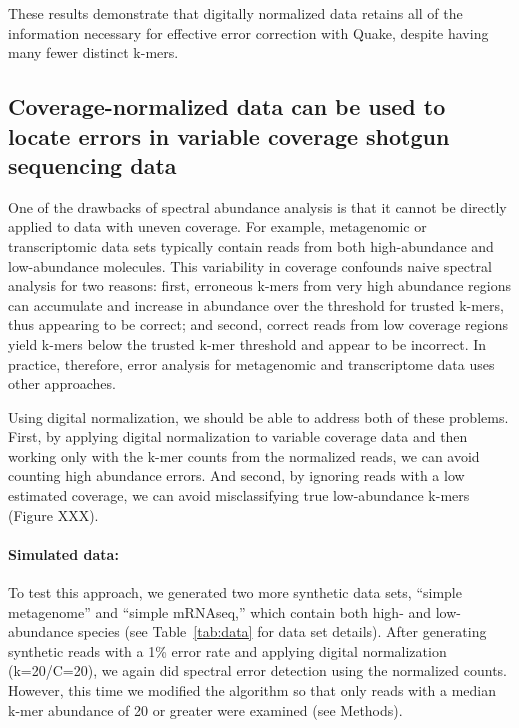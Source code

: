 \documentclass{article}
\begin{document}
These results demonstrate that digitally normalized data retains all
of the information necessary for effective error correction with
Quake, despite having many fewer distinct k-mers.

%

\subsection{Coverage-normalized data can be used to locate errors in variable
coverage shotgun sequencing data}

One of the drawbacks of spectral abundance analysis is that it cannot
be directly applied to data with uneven coverage.  For example,
metagenomic or transcriptomic data sets typically contain reads from
both high-abundance and low-abundance molecules.  This variability in
coverage confounds naive spectral analysis for two reasons: first,
erroneous k-mers from very high abundance regions can accumulate and
increase in abundance over the threshold for trusted k-mers, thus
appearing to be correct; and second, correct reads from low coverage
regions yield k-mers below the trusted k-mer threshold and appear to
be incorrect.  In practice, therefore, error analysis for
metagenomic and transcriptome data uses other approaches.

Using digital normalization, we should be able to address both of these
problems.  First, by applying digital normalization to variable
coverage data and then working only with the k-mer counts from the
normalized reads, we can avoid counting high abundance errors.
And second, by ignoring reads with a low estimated coverage, we can
avoid misclassifying true low-abundance k-mers (Figure XXX).



\paragraph{Simulated data:}
To test this approach, we generated two more synthetic data sets,
``simple metagenome'' and ``simple mRNAseq,'' which contain both high-
and low-abundance species (see Table~\ref{tab:data} for data set
details).  After generating synthetic reads with a 1\% error rate and
applying digital normalization (k=20/C=20), we again did spectral
error detection using the normalized counts.  However, this time we
modified the algorithm so that only reads with a median k-mer
abundance of 20 or greater were examined (see Methods).
\end{document}
